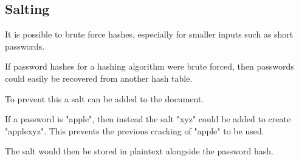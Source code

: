 
\subsection{Salting}

It is possible to brute force hashes, especially for smaller inputs such as short passwords.

If password hashes for a hashing algorithm were brute forced, then passwords could easily be recovered from another hash table.

To prevent this a salt can be added to the document.

If a password is "apple", then instead the salt "xyz" could be added to create "applexyz". This prevents the previous cracking of "apple" to be used.

The salt would then be stored in plaintext alongside the password hash.

